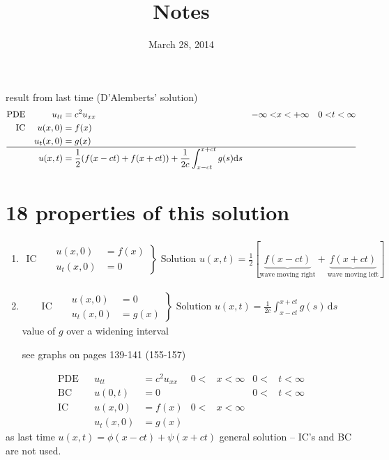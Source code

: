 \documentclass{article}
\begin{document}
\title{Notes}
\date{March 28, 2014}
\maketitle
result from last time (D'Alemberts' solution)
\begin{align*}
  \text{PDE}&&u_{tt}&=c^2u_{xx}&-\infty<&x<+\infty&0<&t<\infty\\
  \text{IC}&&u(x,0)&=f(x)\\
  &&u_t(x,0)&=g(x)\\
  \hline
  &&u(x,t)&=\frac{1}{2}(f(x-ct)+f(x+ct))+\frac{1}{2c}\int_{x-ct}^{x+ct}{g(s)\mathrm{d}s}\\
\end{align*}
\section*{18 properties of this solution}
\begin{enumerate}[C{a}se 1.]
\item
\begin{align*}
  \text{IC}&&\left.\begin{aligned}u(x,0)&=f(x)\\u_t(x,0)&=0\end{aligned}\right\}\text{ Solution }u(x,t)=\frac{1}{2}\left[\underbrace{f(x-ct)}_{\text{wave moving right}}+\underbrace{f(x+ct)}_{\text{wave moving left}}\right]
\end{align*}
\item
\begin{align*}
  \text{IC}&&\left.\begin{aligned}u(x,0)&=0\\u_t(x,0)&=g(x)\end{aligned}\right\}\text{ Solution }u(x,t)=\frac{1}{2c}\int_{x-ct}^{x+ct}{g(s)\,\mathrm{d}s}
\end{align*}
value of $g$ over a widening interval

see graphs on pages 139-141 (155-157)
\end{enumerate}
\begin{align*}
  \text{PDE}&&u_{tt}&=c^2u_{xx}&0<&x<\infty&0<&t<\infty\\
  \text{BC}&&u(0,t)&=0&&&0<&t<\infty\\
  \text{IC}&&u(x,0)&=f(x)&0<&x<\infty\\
  &&u_t(x,0)&=g(x)
\end{align*}
as last time $u(x,t)=\phi(x-ct)+\psi(x+ct)$ general solution -- IC's and BC are not used.
\end{document}
